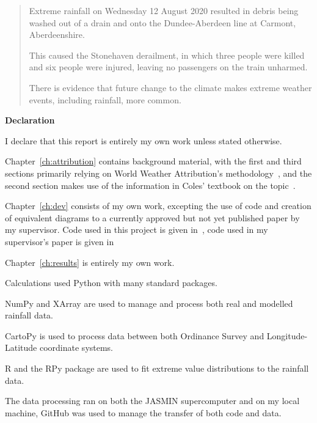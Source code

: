 \documentclass[12pt,a4paper]{report}
\begin{document}
\newpage



\begin{abstract}
Extreme rainfall on Wednesday 12 August 2020 resulted in debris being washed out of a drain and onto the Dundee-Aberdeen line at Carmont, Aberdeenshire.

This caused the Stonehaven derailment,
    in which three people were killed and six people were injured,
    leaving no passengers on the train unharmed.

There is evidence that future change to the climate makes extreme weather events, including rainfall,
    more common.

\end{abstract}


\begin{center}
\textbf{Declaration}
\end{center}

I declare that this report is entirely my own work unless stated otherwise.

Chapter~\ref{ch:attribution} contains background material,
    with the first and third sections primarily relying on World Weather Attribution's methodology~\cite{van_Oldenborgh_et_al_2021},
    and the second section makes use of the information in Coles' textbook on the topic~\cite{Coles_2001}.

Chapter~\ref{ch:dev} consists of my own work,
    excepting the use of code and creation of equivalent diagrams to a currently approved but not yet published paper by my supervisor.
Code used in this project is given in~\cite{Me_Code},
    code used in my supervisor's paper is given in~\cite{Tett_Code}

Chapter~\ref{ch:results} is entirely my own work.

\bigskip

Calculations used Python with many standard packages.

NumPy and XArray are used to manage and process both real and modelled rainfall data.

CartoPy is used to process data between both Ordinance Survey and Longitude-Latitude coordinate systems.

R and the RPy package are used to fit extreme value distributions to the rainfall data.

The data processing ran on both the JASMIN supercomputer and on my local machine,
GitHub was used to manage the transfer of both code and data.
\end{document}
